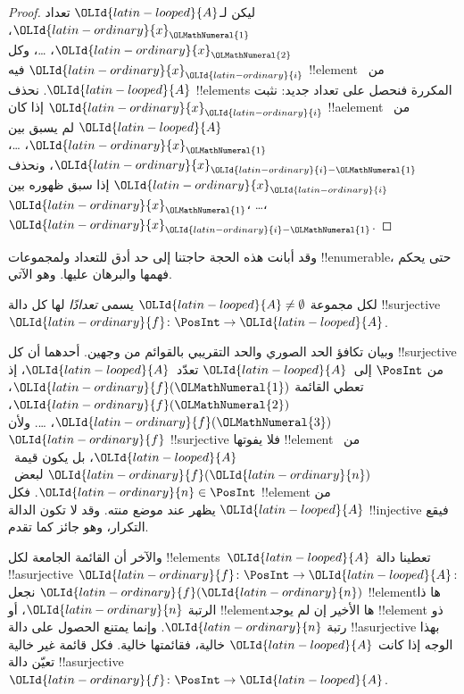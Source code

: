 \documentclass[../../../include/open-logic-section]{subfiles}
\begin{document}
\begin{proof}
ليكن لـ${\OLId{latin-looped}{A}}$ تعداد ${\OLId{latin-ordinary}{x}}_{\OLMathNumeral{1}}$، ${\OLId{latin-ordinary}{x}}_{\OLMathNumeral{2}}$، \dots{}، وكل ${\OLId{latin-ordinary}{x}}_{\OLId{latin-ordinary}{i}}$ فيه !!{element}
من~${\OLId{latin-looped}{A}}$. نحذف !!{element}s المكررة فنحصل على تعداد جديد:
نثبت ${\OLId{latin-ordinary}{x}}_{\OLId{latin-ordinary}{i}}$ إذا كان !!a{element} من~${\OLId{latin-looped}{A}}$ لم يسبق بين
${\OLId{latin-ordinary}{x}}_{\OLMathNumeral{1}}$، \dots، ${\OLId{latin-ordinary}{x}}_{{\OLId{latin-ordinary}{i}}-{\OLMathNumeral{1}}}$، ونحذف ${\OLId{latin-ordinary}{x}}_{\OLId{latin-ordinary}{i}}$ إذا سبق ظهوره بين
${\OLId{latin-ordinary}{x}}_{\OLMathNumeral{1}}$، \dots،~${\OLId{latin-ordinary}{x}}_{{\OLId{latin-ordinary}{i}}-{\OLMathNumeral{1}}}$.
\end{proof}

وقد أبانت هذه الحجة حاجتنا إلى حد أدق للتعداد ولمجموعات
!!{enumerable}، حتى يحكم فهمها والبرهان عليها. وهو الآتي.

\begin{defn}
لكل مجموعة ${\OLId{latin-looped}{A}} \neq \emptyset$ يسمى \emph{تعدادًا} لها كل دالة
!!{surjective} ${\OLId{latin-ordinary}{f}} \colon \PosInt \to {\OLId{latin-looped}{A}}$.
\end{defn}

\begin{explain}
وبيان تكافؤ الحد الصوري والحد التقريبي بالقوائم من وجهين.
أحدهما أن كل !!{surjective} من $\PosInt$ إلى~${\OLId{latin-looped}{A}}$ تعدّد~${\OLId{latin-looped}{A}}$،
إذ تعطي القائمة ${\OLId{latin-ordinary}{f}}({\OLMathNumeral{1}})$، ${\OLId{latin-ordinary}{f}}({\OLMathNumeral{2}})$، ${\OLId{latin-ordinary}{f}}({\OLMathNumeral{3}})$، \dots.
ولأن ${\OLId{latin-ordinary}{f}}$ !!{surjective} فلا يفوتها !!{element} من~${\OLId{latin-looped}{A}}$، بل يكون
قيمة~${\OLId{latin-ordinary}{f}}({\OLId{latin-ordinary}{n}})$ لبعض~${\OLId{latin-ordinary}{n}} \in \PosInt$. فكل !!{element} من ${\OLId{latin-looped}{A}}$ يظهر
عند موضع منته. وقد لا تكون الدالة !!{injective} فيقع التكرار،
وهو جائز كما تقدم.

والآخر أن القائمة الجامعة لكل !!{element}s~${\OLId{latin-looped}{A}}$ تعطينا دالة
!!a{surjective} ${\OLId{latin-ordinary}{f}}\colon \PosInt \to {\OLId{latin-looped}{A}}$: نجعل ${\OLId{latin-ordinary}{f}}({\OLId{latin-ordinary}{n}})$
!!{element}ها ذا الرتبة ${\OLId{latin-ordinary}{n}}$، أو !!{element}ها الأخير إن لم يوجد
!!{element} ذو رتبة ${\OLId{latin-ordinary}{n}}$. وإنما يمتنع الحصول على دالة
!!a{surjective} بهذا الوجه إذا كانت ${\OLId{latin-looped}{A}}$ خالية، فقائمتها خالية.
فكل قائمة غير خالية تعيّن دالة !!a{surjective} ${\OLId{latin-ordinary}{f}}\colon \PosInt \to {\OLId{latin-looped}{A}}$.
\end{explain}
\end{document}
